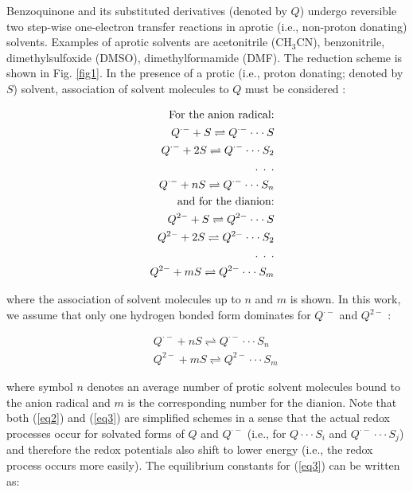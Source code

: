 \documentclass[byrevtex,amssymb,aps,pra,floatfix,letterpaper]{revtex4}
\begin{document}
Benzoquinone and its substituted derivatives (denoted by $Q$) undergo reversible two step-wise one-electron transfer reactions in aprotic (i.e., non-proton donating) solvents. Examples of aprotic solvents are acetonitrile (CH$_3$CN), benzonitrile, dimethylsulfoxide (DMSO), dimethylformamide (DMF). The reduction scheme is shown in Fig. \ref{fig1}. In the presence of a protic (i.e., proton donating; denoted by $S$) solvent, association of solvent molecules to $Q$ must be considered \cite{GONZALEZ}:

\begin{eqnarray}
\label{eq2}
& & \textnormal{For the anion radical:}\\
\nonumber
& & Q^{\cdot-} + S \rightleftharpoons Q^{\cdot-}\cdot\cdot\cdot S\\
\nonumber
& & Q^{\cdot-} + 2S \rightleftharpoons Q^{\cdot-}\cdot\cdot\cdot S_2\\
\nonumber
& & \textnormal{. . .}\\
\nonumber
& & Q^{\cdot-} + nS \rightleftharpoons Q^{\cdot-}\cdot\cdot\cdot S_n\\
\nonumber
& & \textnormal{and for the dianion:}\\
\nonumber
& & Q^{2-} + S \rightleftharpoons Q^{2-}\cdot\cdot\cdot S\\
\nonumber
& & Q^{2-} + 2S \rightleftharpoons Q^{2-}\cdot\cdot\cdot S_2\\
\nonumber
& & \textnormal{. . .}\\
\nonumber
& & Q^{2-} + mS \rightleftharpoons Q^{2-}\cdot\cdot\cdot S_m
\end{eqnarray}

\noindent
where the association of solvent molecules up to $n$ and $m$ is shown. In this work, we assume that only one hydrogen bonded form dominates for $Q^{\cdot−}$ and $Q^{2-}$ \cite{LINSCHITZ}:

\begin{eqnarray}
\label{eq3}
& & Q^{\cdot-} + nS \rightleftharpoons Q^{\cdot-}\cdot\cdot\cdot S_n\\
\nonumber
& & Q^{2-} + mS \rightleftharpoons Q^{2-}\cdot\cdot\cdot S_m
\end{eqnarray}

\noindent
where symbol $n$ denotes an average number of protic solvent molecules bound to the anion radical and $m$ is the corresponding number for the dianion. Note that both (\ref{eq2}) and (\ref{eq3}) are simplified schemes in a sense that the actual redox processes occur for solvated forms of $Q$ and $Q^{\cdot-}$ (i.e., for $Q\cdot\cdot\cdot S_i$ and $Q^{\cdot-}\cdot\cdot\cdot S_j$) and therefore the redox potentials also shift to lower energy (i.e., the redox process occurs more easily). The equilibrium constants for (\ref{eq3}) can be written as:
\end{document}
